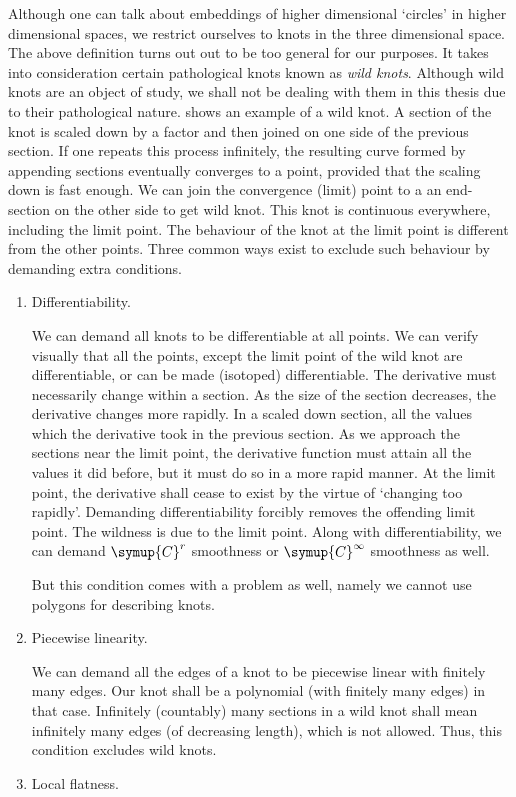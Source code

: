 Although one can talk about embeddings of higher dimensional `circles' in higher dimensional spaces, we restrict ourselves to knots in the three dimensional space. The above definition turns out out to be too general for our purposes. It takes into consideration certain pathological knots known as \textit{wild knots}. Although wild knots are an object of study, we shall not be dealing with them in this thesis due to their pathological nature.  shows an example of a wild knot. A section of the knot is scaled down by a factor and then joined on one side of the previous section. If one repeats this process infinitely, the resulting curve formed by appending sections eventually converges to a point, provided that the scaling down is fast enough. We can join the convergence (limit) point to a an end-section on the other side to get wild knot. This knot is continuous everywhere, including the limit point. The behaviour of the knot at the limit point is different from the other points. Three common ways exist to exclude such behaviour by demanding extra conditions.
\begin{enumerate}
    \item Differentiability.

    We can demand all knots to be differentiable at all points. We can verify visually that all the points, except the limit point of the wild knot are differentiable, or can be made (isotoped) differentiable. The derivative must necessarily change within a section. As the size of the section decreases, the derivative changes more rapidly. In a scaled down section, all the values which the derivative took in the previous section. As we approach the sections near the limit point, the derivative function must attain all the values it did before, but it must do so in a more rapid manner. At the limit point, the derivative shall cease to exist by the virtue of `changing too rapidly'. Demanding differentiability forcibly removes the offending limit point. The wildness is due to the limit point. Along with differentiability, we can demand \(\symup{C}^r\) smoothness or \(\symup{C}^\infty\) smoothness as well.

    But this condition comes with a problem as well, namely we cannot use polygons for describing knots.
    \item Piecewise linearity.

    We can demand all the edges of a knot to be piecewise linear with finitely many edges. Our knot shall be a polynomial (with finitely many edges) in that case. Infinitely (countably) many sections in a wild knot shall mean infinitely many edges (of decreasing length), which is not allowed. Thus, this condition excludes wild knots.
    \item Local flatness.
\end{enumerate}
